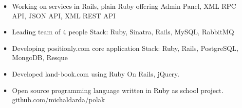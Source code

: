 \documentclass[10pt,a4paper,ragged2e]{altacv}
\begin{document}
\divider

\begin{itemize}
\item Working on services in Rails, plain Ruby offering Admin Panel,
XML RPC API, JSON API, XML REST API \newline
\item Leading team of 4 people
{\small Stack: Ruby, Sinatra, Rails, MySQL, RabbitMQ}
\end{itemize}

\divider

\begin{itemize}
\item Developing positionly.com core application \newline
{\small Stack: Ruby, Rails, PostgreSQL, MongoDB, Resque}
\end{itemize}

\medskip


\begin{itemize}
\item Developed land-book.com using Ruby On Rails, jQuery.
\end{itemize}

\divider

\begin{itemize}
\item Open source programming language written in Ruby as
school project. \newline
github.com/michaldarda/polak
\end{itemize}

\clearpage

\nocite{*}

\end{document}
